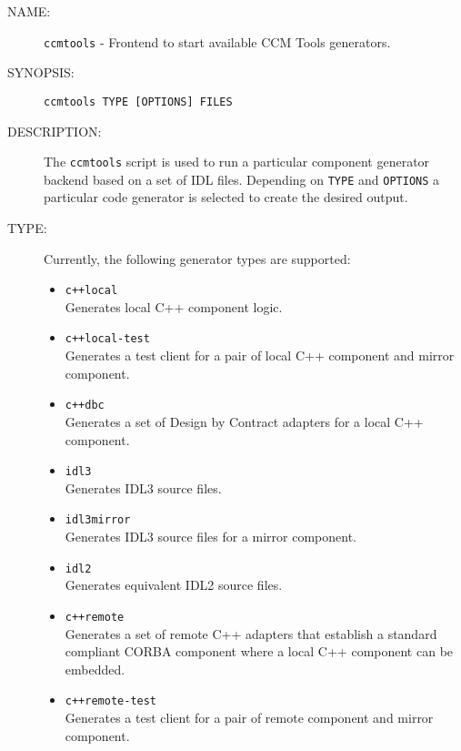 \begin{description}

\item [NAME:] 
  {\tt ccmtools} - Frontend to start available CCM Tools generators.

\item [SYNOPSIS:] 
  {\tt ccmtools TYPE [OPTIONS] FILES}

\item [DESCRIPTION:]
The {\tt ccmtools} script is used to run a particular component 
generator backend based on a set of IDL files. 
Depending on {\tt TYPE} and {\tt OPTIONS} a particular code generator is 
selected to create the desired output.

\item [TYPE:]
  Currently, the following generator types are supported:
  \begin{itemize}
  \item {\tt c++local}\\
    Generates local C++ component logic.
    
  \item {\tt c++local-test} \\
    Generates a test client for a pair of local C++ component and
    mirror component.
    
  \item {\tt c++dbc} \\
    Generates a set of Design by Contract adapters for a local
    C++ component.
    
  \item {\tt idl3 }\\
    Generates IDL3 source files.

  \item {\tt idl3mirror }\\
    Generates IDL3 source files for a mirror component.
    
  \item {\tt idl2} \\
    Generates equivalent IDL2 source files.

  \item {\tt c++remote} \\ 
    Generates a set of remote C++ adapters that establish a standard
    compliant CORBA component where a local C++ component can be embedded.

  \item {\tt c++remote-test}\\
    Generates a test client for a pair of remote component and mirror component.
  \end{itemize}
  

\end{description}
